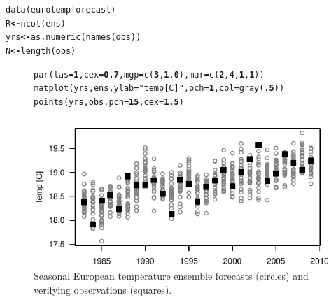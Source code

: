 \documentclass[article]{jss}\usepackage[]{graphicx}\usepackage[]{color}
\makeatletter
\def\maxwidth{ %
  \ifdim\Gin@nat@width>\linewidth
    \linewidth
  \else
    \Gin@nat@width
  \fi
}
\newcommand{\hlnum}[1]{\textcolor[rgb]{0.502,0,0.502}{\textbf{#1}}}%
\newcommand{\hlstr}[1]{\textcolor[rgb]{0.651,0.522,0}{#1}}%
\newcommand{\hlstd}[1]{\textcolor[rgb]{0,0,0}{#1}}%
\newcommand{\hlkwb}[1]{\textcolor[rgb]{0.502,0.502,0.753}{\textbf{#1}}}%
\newcommand{\hlkwc}[1]{\textcolor[rgb]{0,0.502,0.753}{#1}}%
\newcommand{\hlkwd}[1]{\textcolor[rgb]{0,0.267,0.4}{#1}}%
\newenvironment{kframe}{%
 \def\at@end@of@kframe{}%
 \ifinner\ifhmode%
  \def\at@end@of@kframe{\end{minipage}}%
  \begin{minipage}{\columnwidth}%
 \fi\fi%
 \def\FrameCommand##1{\hskip\@totalleftmargin \hskip-\fboxsep
 \colorbox{shadecolor}{##1}\hskip-\fboxsep
     \hskip-\linewidth \hskip-\@totalleftmargin \hskip\columnwidth}%
 \MakeFramed {\advance\hsize-\width
   \@totalleftmargin\z@ \linewidth\hsize
   \@setminipage}}%
 {\par\unskip\endMakeFramed%
 \at@end@of@kframe}
\newenvironment{knitrout}{}{} %
\makeatother
\begin{document}
\begin{knitrout}
\color{fgcolor}\begin{kframe}
\begin{alltt}
\hlkwd{data}\hlstd{(eurotempforecast)}
\hlstd{R}   \hlkwb{<-} \hlkwd{ncol}\hlstd{(ens)}
\hlstd{yrs} \hlkwb{<-} \hlkwd{as.numeric}\hlstd{(}\hlkwd{names}\hlstd{(obs))}
\hlstd{N}   \hlkwb{<-} \hlkwd{length}\hlstd{(obs)}
\end{alltt}
\end{kframe}
\end{knitrout}



\begin{figure}
\begin{center}
%
\begin{knitrout}
\color{fgcolor}\begin{kframe}
\begin{alltt}
\hlkwd{par}\hlstd{(}\hlkwc{las}\hlstd{=}\hlnum{1}\hlstd{,} \hlkwc{cex}\hlstd{=}\hlnum{0.7}\hlstd{,} \hlkwc{mgp}\hlstd{=}\hlkwd{c}\hlstd{(}\hlnum{3}\hlstd{,} \hlnum{1}\hlstd{,} \hlnum{0}\hlstd{),} \hlkwc{mar}\hlstd{=}\hlkwd{c}\hlstd{(}\hlnum{2}\hlstd{,}\hlnum{4}\hlstd{,}\hlnum{1}\hlstd{,}\hlnum{1}\hlstd{))}
\hlkwd{matplot}\hlstd{(yrs, ens,} \hlkwc{ylab}\hlstd{=}\hlstr{"temp [C]"}\hlstd{,} \hlkwc{pch}\hlstd{=}\hlnum{1}\hlstd{,} \hlkwc{col}\hlstd{=}\hlkwd{gray}\hlstd{(}\hlnum{.5}\hlstd{))}
\hlkwd{points}\hlstd{(yrs, obs,} \hlkwc{pch}\hlstd{=}\hlnum{15}\hlstd{,} \hlkwc{cex}\hlstd{=}\hlnum{1.5}\hlstd{)}
\end{alltt}
\end{kframe}
\includegraphics[width=\maxwidth]{figure/gfs-plot-1} 

\end{knitrout}
%
\end{center}
\caption{Seasonal European temperature ensemble forecasts (circles) and verifying observations (squares).}
\label{gfs-plot}
\end{figure}
\end{document}
